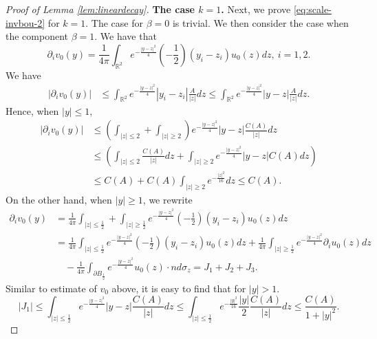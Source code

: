 \documentclass[12pt]{amsart}
\numberwithin{equation}{section}              %
\theoremstyle{remark}
\begin{document}
\begin{proof}[Proof of Lemma \ref{lem:lineardecay}]
\textbf{The case $k=1$.}   			
			Next, we prove \eqref{eq:scale-invbou-2} for $k=1$. The case for $\beta =0$ is trivial.
            We then consider the case when the component $\beta=1$.  We  have that
			\begin{equation*}
				\partial_i  v_0(y) = \frac{1}{4\pi}\int_{\mathbb{R}^2} e^{-\frac{| y-  z|^2}{4  }}\left(-\frac{1}{2}\right)(y_i-z_i)u_0( z)dz, ~ i=1,2.
			\end{equation*}
			We have
			\begin{equation*}
				\begin{aligned}
					|	\partial_i  v_0(y) |&\leq \int_{\mathbb{R}^2} e^{-\frac{| y-  z|^2}{4  }}|y_i-z_i|\frac{A}{|z|}dz	\leq \int_{\mathbb{R}^2} e^{-\frac{| y-  z|^2}{4  }}|y-z|\frac{A}{|z|}dz.
				\end{aligned}
			\end{equation*}
			Hence, when $|y|\leq 1$,
			\begin{equation*}
				\begin{aligned}
					|\partial_i  v_0(y) |&\leq  \left(\int_{|z|\leq 2} + \int_{|z|\geq 2}  \right) e^{-\frac{| y-  z|^2}{4  }}|y-z| \frac{C(A)}{|z|}dz\\
					& \leq \left(\int_{|z|\leq 2} \frac{C(A)}{|z|}dz + \int_{|z|\geq 2}  e^{-\frac{| y-  z|^2}{4  }}|y-z|C(A)dz\right)\\
					&\le C(A) +C(A)\int_{|z|\geq 2}  e^{-\frac{|  z|^2}{16 }}dz\le C(A).
				\end{aligned}
			\end{equation*}
			On the other hand, when $|y|\geq 1$, we rewrite
			\begin{equation*}
				\begin{aligned}
					\partial_i  v_0(y) &= \frac{1}{4\pi}\int_{|z|\leq \frac{1}{2}} + \int_{|z|\geq \frac{1}{2}}  e^{-\frac{| y-  z|^2}{4  }}\left(-\frac{1}{2}\right)(y_i-z_i)u_0( z)dz\\
					&= \frac{1}{4\pi}\int_{|z|\leq \frac{1}{2}}  e^{-\frac{| y-  z|^2}{4  }}\left(-\frac{1}{2}\right)(y_i-z_i)u_0( z)dz  +  \frac{1}{4\pi}\int_{|z|\geq \frac{1}{2}} e^{-\frac{| y-  z|^2}{4  }} \partial_i u_0( z)dz \\
					&\quad -\frac{1}{4\pi}\int_{\partial B_\frac{1}{2}} e^{-\frac{| y-  z|^2}{4  }}  u_0( z)\cdot n  d\sigma_z =J_1 + J_2 + J_3.
				\end{aligned}
			\end{equation*}
			Similar to estimate of $ v_0$ above, it is easy to find that for $|y|>1$.
			\begin{equation*}
				|J_1|\leq \int_{|z|\leq \frac{1}{2}}  e^{-\frac{| y-  z|^2}{4  }}|y-z|\frac{C(A)}{|z|}dz \leq  \int_{|z|\leq \frac{1}{2}}  e^{-\frac{| y|^2}{16}}\frac{|y|}{2}\frac{C(A)}{|z|}dz \leq \frac{C(A)}{1+|y|^2}.

\end{equation*}
\end{proof}
\end{document}

